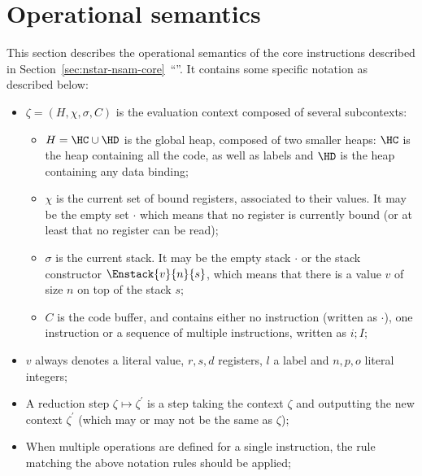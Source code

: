 \section{Operational semantics}\label{sec:nstar-nsam-opsem}

This section describes the operational semantics of the core instructions described in Section~\ref{sec:nstar-nsam-core}~``''. It contains some specific notation as described below:
\begin{itemize}
	\item $\zeta = (H, \chi, \sigma, C)$ is the evaluation context composed of several subcontexts:
	      \begin{itemize}
		      \item $H = \HC \cup \HD$ is the global heap, composed of two smaller heaps: $\HC$ is the heap containing all the code, as well as labels and $\HD$ is the heap containing any data binding;
		      \item $\chi$ is the current set of bound registers, associated to their values. It may be the empty set $\cdot$ which means that no register is currently bound (or at least that no register can be read);
		      \item $\sigma$ is the current stack. It may be the empty stack $\cdot$ or the stack constructor $\Enstack{v}{n}{s}$, which means that there is a value $v$ of size $n$ on top of the stack $s$;
		      \item $C$ is the code buffer, and contains either no instruction (written as $\cdot$), one instruction or a sequence of multiple instructions, written as $i; I$;
	      \end{itemize}
	\item $v$ always denotes a literal value, $r, s, d$ registers, $l$ a label and $n, p, o$ literal integers;
	\item A reduction step $\zeta \mapsto \zeta^{\prime}$ is a step taking the context $\zeta$ and outputting the new context $\zeta^{\prime}$ (which may or may not be the same as $\zeta$);
	\item When multiple operations are defined for a single instruction, the rule matching the above notation rules should be applied;
\end{itemize}

